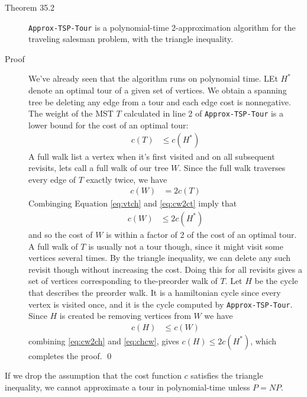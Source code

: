 \begin{description}
\item[Theorem 35.2] \texttt{Approx-TSP-Tour} is a polynomial-time
  2-approximation algorithm for the traveling salesman problem, with the
  triangle inequality.

\item[Proof] We've already seen that the algorithm runs on polynomial time.  LEt
  $H^*$ denote an optimal tour of a given set of vertices. We obtain a spanning
  tree be deleting any edge from a tour and each edge cost is nonnegative. The
  weight of the MST $T$ calculated in line 2 of \texttt{Approx-TSP-Tour} is a
  lower bound for the cost of an optimal tour:
  \begin{align}
    c(T) &\leq c(H^*) \label{eq:vtch}
  \end{align}
  A full walk list a vertex when it's first visited and on all subsequent
  revisits, lets call a full walk of our tree $W$.  Since the full walk
  traverses every edge of $T$ exactly twice, we have
  \begin{align}
    c(W) &= 2c(T) \label{eq:cw2ct}
  \end{align}
  Combinging Equation \ref{eq:vtch} and \ref{eq:cw2ct} imply that
  \begin{align}
    c(W) &\leq 2c(H^*) \label{eq:cw2ch}
  \end{align}
  and so the cost of $W$ is within a factor of 2 of the cost of an optimal tour.
  A full walk of $T$ is usually not a tour though, since it might visit some
  vertices several times.  By the triangle inequality, we can delete any such
  revisit though without increasing the cost. Doing this for all revisits gives
  a set of vertices corresponding to the-preorder walk of $T$.  Let $H$ be the
  cycle that describes the preorder walk. It is a hamiltonian cycle since every
  vertex is visited once, and it is the cycle computed by
  \texttt{Approx-TSP-Tour}. Since $H$ is created be removing vertices from $W$
  we have
  \begin{align}
    c(H) &\leq c(W) \label{eq:chcw}
  \end{align}
  combining \ref{eq:cw2ch} and \ref{eq:chcw}, gives $c(H) \leq 2c(H^*)$, which
  completes the proof.  \qed
\end{description}

If we drop the assumption that the cost function $c$ satisfies the triangle
inequality, we cannot approximate a tour in polynomial-time unless $P=NP$.

